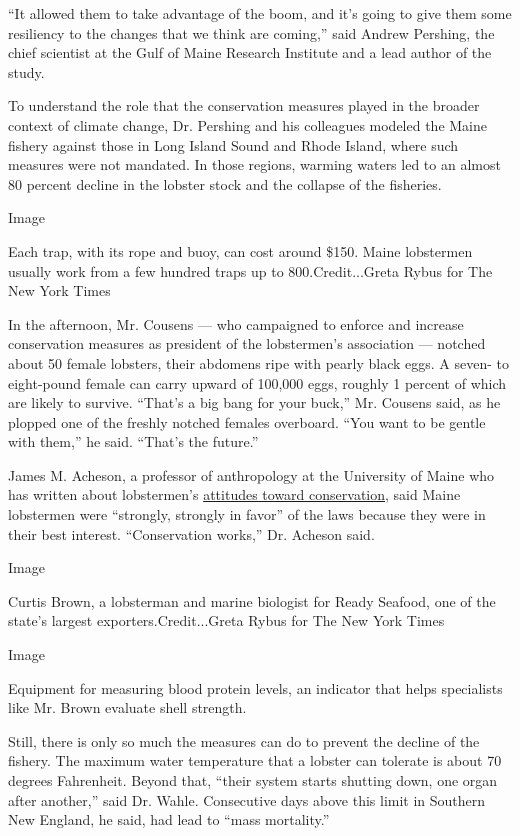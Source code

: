 ``It allowed them to take advantage of the boom, and it's going to give
them some resiliency to the changes that we think are coming,'' said
Andrew Pershing, the chief scientist at the Gulf of Maine Research
Institute and a lead author of the study.

To understand the role that the conservation measures played in the
broader context of climate change, Dr. Pershing and his colleagues
modeled the Maine fishery against those in Long Island Sound and Rhode
Island, where such measures were not mandated. In those regions, warming
waters led to an almost 80 percent decline in the lobster stock and the
collapse of the fisheries.

Image

Each trap, with its rope and buoy, can cost around \$150. Maine
lobstermen usually work from a few hundred traps up to
800.Credit...Greta Rybus for The New York Times

In the afternoon, Mr. Cousens --- who campaigned to enforce and increase
conservation measures as president of the lobstermen's association ---
notched about 50 female lobsters, their abdomens ripe with pearly black
eggs. A seven- to eight-pound female can carry upward of 100,000 eggs,
roughly 1 percent of which are likely to survive. ``That's a big bang
for your buck,'' Mr. Cousens said, as he plopped one of the freshly
notched females overboard. ``You want to be gentle with them,'' he said.
``That's the future.''

James M. Acheson, a professor of anthropology at the University of Maine
who has written about lobstermen's
\href{https://www.jstor.org/stable/26268854}{attitudes toward
conservation}, said Maine lobstermen were ``strongly, strongly in
favor'' of the laws because they were in their best interest.
``Conservation works,'' Dr. Acheson said.

Image

Curtis Brown, a lobsterman and marine biologist for Ready Seafood, one
of the state's largest exporters.Credit...Greta Rybus for The New York
Times

Image

Equipment for measuring blood protein levels, an indicator that helps
specialists like Mr. Brown evaluate shell strength.

Still, there is only so much the measures can do to prevent the decline
of the fishery. The maximum water temperature that a lobster can
tolerate is about 70 degrees Fahrenheit. Beyond that, ``their system
starts shutting down, one organ after another,'' said Dr. Wahle.
Consecutive days above this limit in Southern New England, he said, had
lead to ``mass mortality.''

